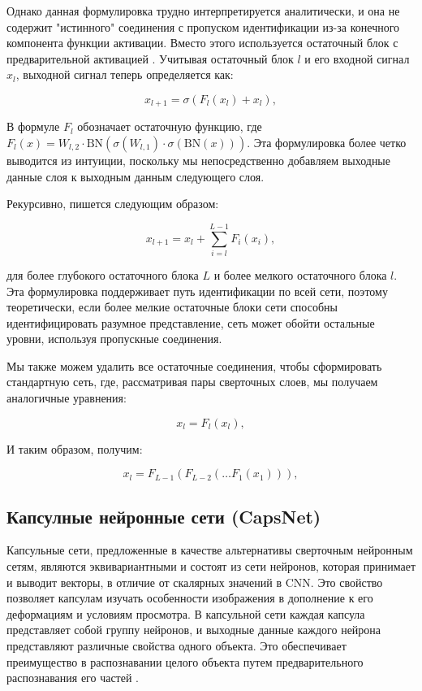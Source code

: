 Однако данная формулировка трудно интерпретируется аналитически, и она не содержит "истинного" соединения с пропуском идентификации из-за конечного компонента функции активации. Вместо этого используется остаточный блок с предварительной активацией \cite{he2016identity}. Учитывая остаточный блок \(l\) и его входной сигнал \(x_{l}\), выходной сигнал теперь определяется как:

\begin{equation}
    x_{l + 1} = \sigma(F_{l}(x_{l}) + x_{l})
, \end{equation}

В формуле \(F_{l}\) обозначает остаточную функцию, где \(F_{l}(x) = W_{l,2} \cdot \text{BN}(\sigma(W_{l,1}) \cdot \sigma(\text{BN}(x)))\). Эта формулировка более четко выводится из интуиции, поскольку мы непосредственно добавляем выходные данные слоя к выходным данным следующего слоя.

Рекурсивно, пишется следующим образом:

\begin{equation}
    x_{l + 1} = x_{l} + \sum_{i = l}^{L - 1} F_{i}(x_{i})
, \end{equation}

для более глубокого остаточного блока \(L\) и более мелкого остаточного блока \(l\). Эта формулировка поддерживает путь идентификации по всей сети, поэтому теоретически, если более мелкие остаточные блоки сети способны идентифицировать разумное представление, сеть может обойти остальные уровни, используя пропускные соединения.

Мы также можем удалить все остаточные соединения, чтобы сформировать стандартную сеть, где, рассматривая пары сверточных слоев, мы получаем аналогичные уравнения:

\begin{equation}
    x_{l} = F_{l}(x_{l})
, \end{equation}

И таким образом, получим:

\begin{equation}
    x_{l} = F_{L - 1}(F_{L - 2}(\ldots F_{1}(x_{1})))
, \end{equation}

\subsection{Капсулные нейронные сети (CapsNet)}

Капсульные сети, предложенные в качестве альтернативы сверточным нейронным сетям, являются эквивариантными и состоят из сети нейронов, которая принимает и выводит векторы, в отличие от скалярных значений в CNN. Это свойство позволяет капсулам изучать особенности изображения в дополнение к его деформациям и условиям просмотра. В капсульной сети каждая капсула представляет собой группу нейронов, и выходные данные каждого нейрона представляют различные свойства одного объекта. Это обеспечивает преимущество в распознавании целого объекта путем предварительного распознавания его частей \cite{lecun2015deep}.

